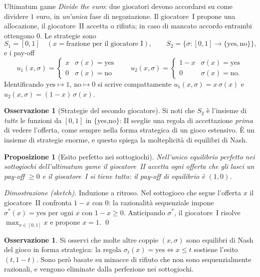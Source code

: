 \documentclass[12pt,a4paper,twoside]{book}
\theoremstyle{plain}
\newtheorem{proposition}[theorem]{Proposizione}
\theoremstyle{definition}
\newtheorem{remark}[theorem]{Osservazione}
\begin{document}
\begin{defbox}{Ultimatum game}
\emph{Divide the euro}: due giocatori devono accordarsi su come dividere $1$ euro, in
\emph{un'unica} fase di negoziazione. Il giocatore~I propone una allocazione, il giocatore~II
accetta o rifiuta; in caso di mancato accordo entrambi ottengono $0$. Le strategie sono
\[
  S_1=[0,1]\quad (x=\text{frazione per il giocatore I}),\qquad
  S_2=\{\sigma:[0,1]\to\{\text{yes},\text{no}\}\},
\]
e i pay-off
\[
  u_1(x,\sigma)=\begin{cases}x&\sigma(x)=\text{yes}\\0&\sigma(x)=\text{no}\end{cases}
  \qquad
  u_2(x,\sigma)=\begin{cases}1-x&\sigma(x)=\text{yes}\\0&\sigma(x)=\text{no}.\end{cases}
\]
Identificando $\text{yes}\mapsto1$, $\text{no}\mapsto0$ si scrive compattamente
$u_1(x,\sigma)=x\,\sigma(x)$ e $u_2(x,\sigma)=(1-x)\,\sigma(x)$.
\end{defbox}

\begin{remark}[Strategie del secondo giocatore]
Si noti che $S_2$ è l'insieme di \emph{tutte} le funzioni da $[0,1]$ in $\{$yes,no$\}$: II
sceglie una regola di accettazione \emph{prima} di vedere l'offerta, come sempre nella forma
strategica di un gioco estensivo. È un insieme di strategie enorme, e questo spiega la
molteplicità di equilibri di Nash.
\end{remark}

\begin{proposition}[Esito perfetto nei sottogiochi]
Nell'unico equilibrio perfetto nei sottogiochi dell'ultimatum game il giocatore~II accetta
ogni offerta che gli lasci un pay-off $\ge0$ e il giocatore~I si tiene tutto: il pay-off di
equilibrio è $(1,0)$.
\end{proposition}

\textit{Dimostrazione (sketch).} Induzione a ritroso. Nel sottogioco che segue l'offerta $x$
il giocatore~II confronta $1-x$ con $0$: la razionalità sequenziale impone
$\sigma^*(x)=\text{yes}$ per ogni $x$ con $1-x\ge0$. Anticipando $\sigma^*$, il giocatore~I
risolve $\max_{x\in[0,1]}x$ e propone $x=1$. \qed

\begin{remark}
Si osservi che molte altre coppie $(x,\sigma)$ sono equilibri di Nash del gioco in forma
strategica: la regola $\sigma_t(x)=\text{yes}\iff x\le t$ sostiene l'esito $(t,1-t)$. Sono
però basate su minacce di rifiuto che non sono sequenzialmente razionali, e vengono eliminate
dalla perfezione nei sottogiochi.
\end{remark}
\end{document}
